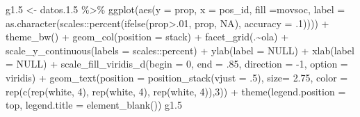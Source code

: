 \documentclass[
  12pt,
]{book}
\newenvironment{Shaded}{\begin{snugshade}}{\end{snugshade}}
\newcommand{\AttributeTok}[1]{\textcolor[rgb]{0.77,0.63,0.00}{#1}}
\newcommand{\ConstantTok}[1]{\textcolor[rgb]{0.00,0.00,0.00}{#1}}
\newcommand{\DecValTok}[1]{\textcolor[rgb]{0.00,0.00,0.81}{#1}}
\newcommand{\FloatTok}[1]{\textcolor[rgb]{0.00,0.00,0.81}{#1}}
\newcommand{\FunctionTok}[1]{\textcolor[rgb]{0.00,0.00,0.00}{#1}}
\newcommand{\NormalTok}[1]{#1}
\newcommand{\OtherTok}[1]{\textcolor[rgb]{0.56,0.35,0.01}{#1}}
\newcommand{\SpecialCharTok}[1]{\textcolor[rgb]{0.00,0.00,0.00}{#1}}
\newcommand{\StringTok}[1]{\textcolor[rgb]{0.31,0.60,0.02}{#1}}
\begin{document}
\begin{Shaded}
\begin{Highlighting}[]
\NormalTok{g1}\FloatTok{.5} \OtherTok{\textless{}{-}}\NormalTok{ datos.}\FloatTok{1.5} \SpecialCharTok{\%\textgreater{}\%} 
  \FunctionTok{ggplot}\NormalTok{(}\FunctionTok{aes}\NormalTok{(}\AttributeTok{y =}\NormalTok{ prop, }\AttributeTok{x =}\NormalTok{ pos\_id, }\AttributeTok{fill =}\NormalTok{movsoc, }
             \AttributeTok{label =} \FunctionTok{as.character}\NormalTok{(scales}\SpecialCharTok{::}\FunctionTok{percent}\NormalTok{(}\FunctionTok{ifelse}\NormalTok{(prop}\SpecialCharTok{\textgreater{}}\NormalTok{.}\DecValTok{01}\NormalTok{, prop, }\ConstantTok{NA}\NormalTok{), }\AttributeTok{accuracy =}\NormalTok{ .}\DecValTok{1}\NormalTok{)))) }\SpecialCharTok{+}
  \FunctionTok{theme\_bw}\NormalTok{() }\SpecialCharTok{+}
  \FunctionTok{geom\_col}\NormalTok{(}\AttributeTok{position =} \StringTok{\textquotesingle{}stack\textquotesingle{}}\NormalTok{) }\SpecialCharTok{+}
  \FunctionTok{facet\_grid}\NormalTok{(.}\SpecialCharTok{\textasciitilde{}}\NormalTok{ola) }\SpecialCharTok{+}
  \FunctionTok{scale\_y\_continuous}\NormalTok{(}\AttributeTok{labels =}\NormalTok{ scales}\SpecialCharTok{::}\NormalTok{percent) }\SpecialCharTok{+}
  \FunctionTok{ylab}\NormalTok{(}\AttributeTok{label =} \ConstantTok{NULL}\NormalTok{) }\SpecialCharTok{+}
  \FunctionTok{xlab}\NormalTok{(}\AttributeTok{label =} \ConstantTok{NULL}\NormalTok{) }\SpecialCharTok{+}
  \FunctionTok{scale\_fill\_viridis\_d}\NormalTok{(}\AttributeTok{begin =} \DecValTok{0}\NormalTok{, }\AttributeTok{end =}\NormalTok{ .}\DecValTok{85}\NormalTok{, }\AttributeTok{direction =} \SpecialCharTok{{-}}\DecValTok{1}\NormalTok{, }\AttributeTok{option =} \StringTok{\textquotesingle{}viridis\textquotesingle{}}\NormalTok{) }\SpecialCharTok{+}
  \FunctionTok{geom\_text}\NormalTok{(}\AttributeTok{position =} \FunctionTok{position\_stack}\NormalTok{(}\AttributeTok{vjust =}\NormalTok{ .}\DecValTok{5}\NormalTok{),}
            \AttributeTok{size=} \FloatTok{2.75}\NormalTok{,}
            \AttributeTok{color =} \FunctionTok{rep}\NormalTok{(}\FunctionTok{c}\NormalTok{(}\FunctionTok{rep}\NormalTok{(}\StringTok{\textquotesingle{}white\textquotesingle{}}\NormalTok{, }\DecValTok{4}\NormalTok{),}
                          \FunctionTok{rep}\NormalTok{(}\StringTok{\textquotesingle{}white\textquotesingle{}}\NormalTok{, }\DecValTok{4}\NormalTok{),}
                          \FunctionTok{rep}\NormalTok{(}\StringTok{\textquotesingle{}white\textquotesingle{}}\NormalTok{, }\DecValTok{4}\NormalTok{)),}\DecValTok{3}\NormalTok{)) }\SpecialCharTok{+} 
  \FunctionTok{theme}\NormalTok{(}\AttributeTok{legend.position =} \StringTok{\textquotesingle{}top\textquotesingle{}}\NormalTok{,}
        \AttributeTok{legend.title =} \FunctionTok{element\_blank}\NormalTok{()) }
\NormalTok{g1}\FloatTok{.5}
\end{Highlighting}
\end{Shaded}
\end{document}

